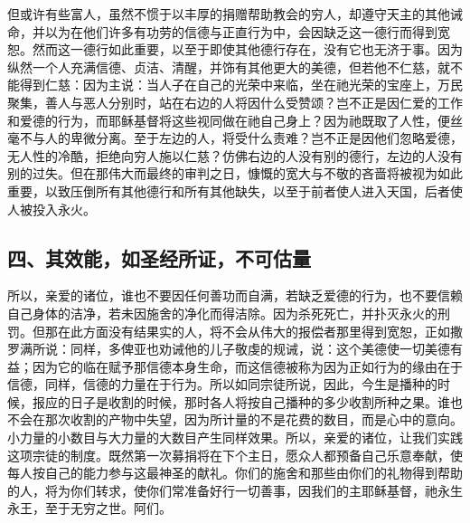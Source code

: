但或许有些富人，虽然不惯于以丰厚的捐赠帮助教会的穷人，却遵守天主的其他诫命，并以为在他们许多有功劳的信德与正直行为中，会因缺乏这一德行而得到宽恕。然而这一德行如此重要，以至于即使其他德行存在，没有它也无济于事。因为纵然一个人充满信德、贞洁、清醒，并饰有其他更大的美德，但若他不仁慈，就不能得到仁慈：因为主说：当人子在自己的光荣中来临，坐在祂光荣的宝座上，万民聚集，善人与恶人分别时，站在右边的人将因什么受赞颂？岂不正是因仁爱的工作和爱德的行为，而耶稣基督将这些视同做在祂自己身上？因为祂既取了人性，便丝毫不与人的卑微分离。至于左边的人，将受什么责难？岂不正是因他们忽略爱德，无人性的冷酷，拒绝向穷人施以仁慈？仿佛右边的人没有别的德行，左边的人没有别的过失。但在那伟大而最终的审判之日，慷慨的宽大与不敬的吝啬将被视为如此重要，以致压倒所有其他德行和所有其他缺失，以至于前者使人进入天国，后者使人被投入永火。\par


\subsection{四、其效能，如圣经所证，不可估量}

所以，亲爱的诸位，谁也不要因任何善功而自满，若缺乏爱德的行为，也不要信赖自己身体的洁净，若未因施舍的净化而得洁除。因为杀死死亡，并扑灭永火的刑罚。但那在此方面没有结果实的人，将不会从伟大的报偿者那里得到宽恕，正如撒罗满所说：同样，多俾亚也劝诫他的儿子敬虔的规诫，说：这个美德使一切美德有益；因为它的临在赋予那信德本身生命，而这信德被称为因为正如行为的缘由在于信德，同样，信德的力量在于行为。所以如同宗徒所说，因此，今生是播种的时候，报应的日子是收割的时候，那时各人将按自己播种的多少收割所种之果。谁也不会在那次收割的产物中失望，因为所计量的不是花费的数目，而是心中的意向。小力量的小数目与大力量的大数目产生同样效果。所以，亲爱的诸位，让我们实践这项宗徒的制度。既然第一次募捐将在下个主日，愿众人都预备自己乐意奉献，使每人按自己的能力参与这最神圣的献礼。你们的施舍和那些由你们的礼物得到帮助的人，将为你们转求，使你们常准备好行一切善事，因我们的主耶稣基督，祂永生永王，至于无穷之世。阿们。\par

